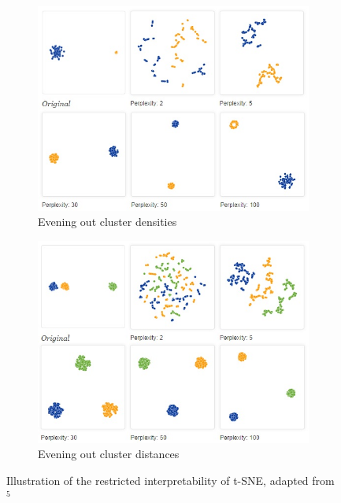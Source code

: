 \begin{figure}[!]
     \centering
     \begin{subfigure}[t]{0.9\columnwidth}
    	\centering
    	\includegraphics[width=1\columnwidth]{images/t-sne_density.jpg}
    	\caption{Evening out cluster densities}
        \label{fig:t-sne_density}
    \end{subfigure}
     \hfill
     \begin{subfigure}[t]{0.9\columnwidth}
    	\centering
    	\includegraphics[width=\columnwidth]{images/t-sne_cluster_distances.jpg}
    	\caption{Evening out cluster distances}
        \label{fig:t-sne_cluster_distances}
    \end{subfigure}
     \caption[Interpretability of t-SNE]{Illustration of the restricted interpretability of t-SNE, adapted from $^5$}
    \label{fig:t-sne_interpret}
\end{figure}

